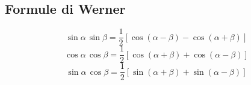 \documentclass{article}
\begin{document}
  \subsection*{Formule di Werner}
  \begin{equation}
    \sin\alpha \, \sin\beta = \frac{1}{2} [ \cos(\alpha - \beta) - \cos(\alpha + \beta)]
  \end{equation}
  \begin{equation}
    \cos\alpha \, \cos\beta = \frac{1}{2} [\cos(\alpha + \beta) + \cos(\alpha - \beta)]
  \end{equation}
  \begin{equation}
    \sin\alpha \, \cos\beta = \frac{1}{2} [\sin(\alpha + \beta) + \sin(\alpha - \beta)]
  \end{equation}
\end{document}
